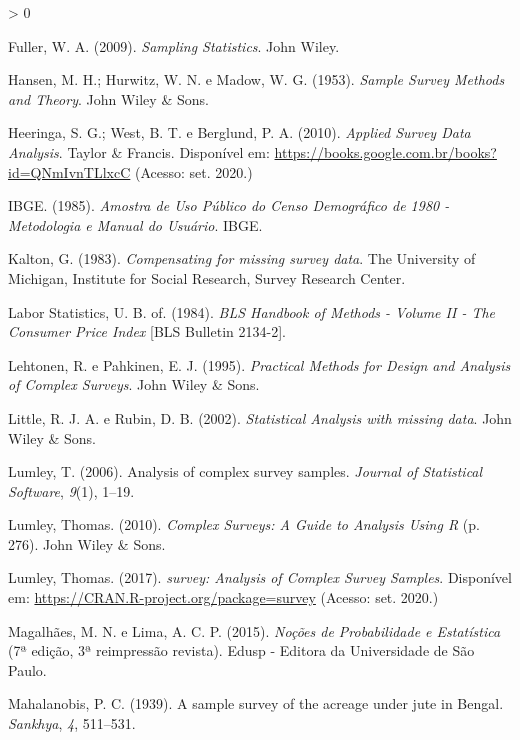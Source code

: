 \documentclass[
  12pt,
  brazilian,
]{book}
\newlength{\cslhangindent}
\newenvironment{CSLReferences}[2] %
 {%
  \setlength{\parindent}{0pt}
  \ifodd #1 \everypar{\setlength{\hangindent}{\cslhangindent}}\ignorespaces\fi
  \ifnum #2 > 0
  \setlength{\parskip}{#2\baselineskip}
  \fi
 }%
 {}
\theoremstyle{definition}
\theoremstyle{definition}
\theoremstyle{definition}
\theoremstyle{definition}
\theoremstyle{remark}
\begin{document}
\begin{CSLReferences}{1}{0}
\leavevmode\hypertarget{ref-Fuller2009}{}%
Fuller, W. A. (2009). \emph{Sampling Statistics}. John Wiley.

\leavevmode\hypertarget{ref-hansen1953}{}%
Hansen, M. H.; Hurwitz, W. N. e Madow, W. G. (1953). \emph{Sample Survey Methods and Theory}. John Wiley \& Sons.

\leavevmode\hypertarget{ref-heeringa}{}%
Heeringa, S. G.; West, B. T. e Berglund, P. A. (2010). \emph{Applied Survey Data Analysis}. Taylor \& Francis. Disponível em: \url{https://books.google.com.br/books?id=QNmIvnTLlxcC} (Acesso: set. 2020.)

\leavevmode\hypertarget{ref-IBGE1985}{}%
IBGE. (1985). \emph{Amostra de {Uso} {Público} do {Censo} {Demográfico} de 1980 - {Metodologia} e {Manual} do {Usuário}}. IBGE.

\leavevmode\hypertarget{ref-kalton83a}{}%
Kalton, G. (1983). \emph{Compensating for missing survey data}. The University of Michigan, Institute for Social Research, Survey Research Center.

\leavevmode\hypertarget{ref-USBureau1984}{}%
Labor Statistics, U. B. of. (1984). \emph{BLS Handbook of Methods - Volume II - The Consumer Price Index} {[}BLS Bulletin 2134-2{]}.

\leavevmode\hypertarget{ref-lethonen}{}%
Lehtonen, R. e Pahkinen, E. J. (1995). \emph{Practical Methods for Design and Analysis of Complex Surveys}. John Wiley \& Sons.

\leavevmode\hypertarget{ref-LR2002}{}%
Little, R. J. A. e Rubin, D. B. (2002). \emph{Statistical Analysis with missing data}. John Wiley \& Sons.

\leavevmode\hypertarget{ref-Lumley2006}{}%
Lumley, T. (2006). Analysis of complex survey samples. \emph{Journal of Statistical Software}, \emph{9}(1), 1--19.

\leavevmode\hypertarget{ref-Lumley2010}{}%
Lumley, Thomas. (2010). \emph{{Complex Surveys: A Guide to Analysis Using R}} (p. 276). John Wiley \& Sons.

\leavevmode\hypertarget{ref-R-survey}{}%
Lumley, Thomas. (2017). \emph{survey: Analysis of Complex Survey Samples}. Disponível em: \url{https://CRAN.R-project.org/package=survey} (Acesso: set. 2020.)

\leavevmode\hypertarget{ref-Marcos2015}{}%
Magalhães, M. N. e Lima, A. C. P. (2015). \emph{Noções de Probabilidade e Estatística} (7ª edição, 3ª reimpressão revista). Edusp - Editora da Universidade de São Paulo.

\leavevmode\hypertarget{ref-Mahala1939}{}%
Mahalanobis, P. C. (1939). A sample survey of the acreage under jute in Bengal. \emph{Sankhya}, \emph{4}, 511--531.


\end{CSLReferences}
\end{document}
